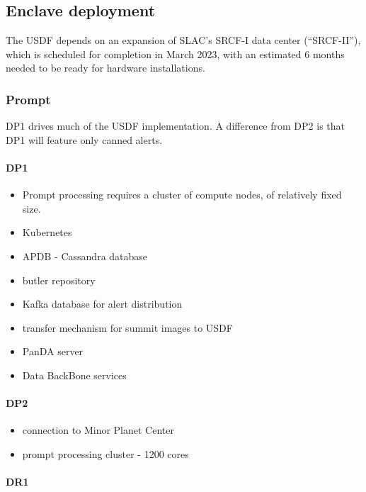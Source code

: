 \subsection {Enclave deployment}

The USDF depends on an expansion of SLAC's SRCF-I data center
(``SRCF-II''), which is scheduled for completion in March 2023, with
an estimated 6 months needed to be ready for hardware installations.

\subsubsection{Prompt}

DP1 drives much of the USDF implementation. A difference from DP2 is
that DP1 will feature only canned alerts. 

\paragraph{ DP1}

 \begin{itemize}
  \item Prompt processing requires a cluster of compute nodes, of
    relatively fixed size.
  \item Kubernetes
  \item \gls{APDB} - Cassandra database
  \item butler repository
  \item Kafka database for alert distribution
  \item transfer mechanism for summit images to USDF
  \item PanDA server
  \item Data BackBone services
 \end{itemize}

 \paragraph{DP2}

 \begin{itemize}
 \item connection to Minor Planet Center
 \item prompt processing cluster - 1200 cores
  \end{itemize}

 \paragraph{DR1}


